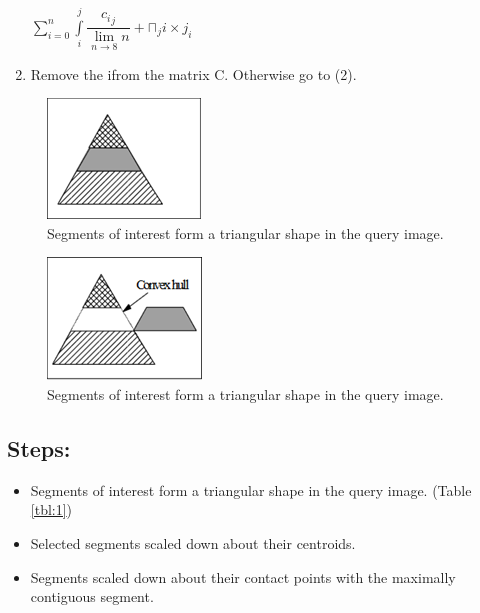 \documentclass{article}
\begin{document}
\begin{enumerate}
\begin{center}
        $\sum\limits_{i=0}^n \int\limits_i^j \dfrac{{c_i}_j}{\lim\limits_{n \to 8}n} + \sqcap{_j}i \times j_i
    $
    \end{center} 
    \item Remove the ifrom the matrix C.  Otherwise go to (2).
\end{enumerate}
\begin{figure}
    \begin{center}
    \centering
    \includegraphics{1.png}
    \caption{Segments of interest form a triangular shape in the query image.}
    \label{fig:1}
    \end{center}
\end{figure}

\begin{figure}
    \begin{center}
    \centering
    \includegraphics{2.png}
    \caption{Segments of interest form a triangular shape in the query image.}
    \label{fig:2}
    \end{center}
\end{figure}



\subsection*{Steps:}
\begin{itemize}
    \item 	Segments of interest form a triangular shape in the query image. (Table \ref{tbl:1})
    \item 	Selected segments scaled down about their centroids.
    \item 	Segments scaled down about their contact points with the maximally contiguous segment.
\end{itemize}
\end{document}
